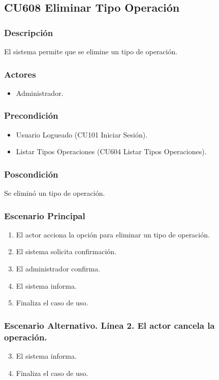 \subsection{CU608 Eliminar Tipo Operaci\'{o}n}
\subsubsection{Descripci\'{o}n}
El sistema permite que se elimine un tipo de operaci\'{o}n.
\subsubsection{Actores}
\begin{itemize}
\item Administrador.
\end{itemize}
\subsubsection{Precondici\'{o}n}
\begin{itemize}
\item Usuario Logueado (CU101 Iniciar Sesi\'{o}n).
\item Listar Tipos Operaciones (CU604 Listar Tipos Operaciones).
\end{itemize}
\subsubsection{Poscondici\'{o}n}
Se elimin\'{o} un tipo de operaci\'{o}n.
\subsubsection{Escenario Principal}
\begin{enumerate}
\item El actor acciona la opci\'{o}n para eliminar un tipo de operaci\'{o}n.
\item El sistema solicita confirmaci\'{o}n.
\item El administrador confirma.
\item El sistema informa.
\item Finaliza el caso de uso.
\end{enumerate}
\subsubsection{Escenario Alternativo. L\'{i}nea 2. El actor cancela la operaci\'{o}n.}
\begin{enumerate}
\setcounter{enumi}{2}
\item El sistema informa.
\item Finaliza el caso de uso.
\end{enumerate}
